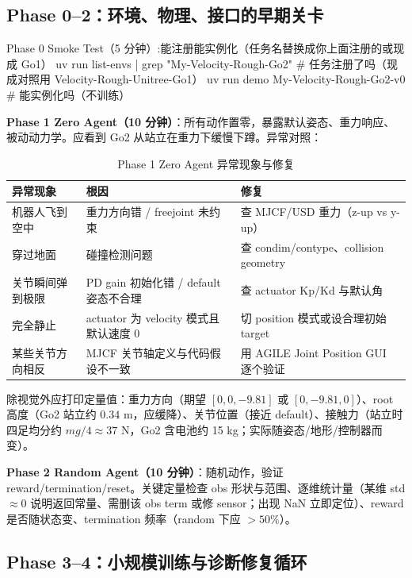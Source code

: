 \subsection{Phase 0--2：环境、物理、接口的早期关卡}

\begin{codebox}[bash]{Phase 0 Smoke Test（5 分钟）:能注册能实例化（任务名替换成你上面注册的或现成 Go1）}
uv run list-envs | grep "My-Velocity-Rough-Go2"   # 任务注册了吗（现成对照用 Velocity-Rough-Unitree-Go1）
uv run demo My-Velocity-Rough-Go2-v0              # 能实例化吗（不训练）
\end{codebox}

\textbf{Phase 1 Zero Agent（10 分钟）}：所有动作置零，暴露默认姿态、重力响应、被动动力学。应看到 Go2 从站立在重力下缓慢下蹲。异常对照：

\begin{table}[H]
\centering
\caption{Phase 1 Zero Agent 异常现象与修复}
\label{tab:rlmc-diag-zero}
\begin{tabular}{p{3.6cm}p{4.4cm}p{4.0cm}}
\hline
异常现象 & 根因 & 修复 \\
\hline
机器人飞到空中 & 重力方向错 / freejoint 未约束 & 查 MJCF/USD 重力（z-up vs y-up） \\
穿过地面 & 碰撞检测问题 & 查 condim/contype、collision geometry \\
关节瞬间弹到极限 & PD gain 初始化错 / default 姿态不合理 & 查 actuator Kp/Kd 与默认角 \\
完全静止 & actuator 为 velocity 模式且默认速度 0 & 切 position 模式或设合理初始 target \\
某些关节方向相反 & MJCF 关节轴定义与代码假设不一致 & 用 AGILE Joint Position GUI 逐个验证 \\
\hline
\end{tabular}
\end{table}

除视觉外应打印定量值：重力方向（期望 $[0,0,-9.81]$ 或 $[0,-9.81,0]$）、root 高度（Go2 站立约 $0.34$ m，应缓降）、关节位置（接近 default）、接触力（站立时四足均分约 $mg/4\approx 37$ N，Go2 含电池约 15 kg；实际随姿态/地形/控制器而变）。

\textbf{Phase 2 Random Agent（10 分钟）}：随机动作，验证 reward/termination/reset。关键定量检查 obs 形状与范围、逐维统计量（某维 std$\approx 0$ 说明返回常量、需删该 obs term 或修 sensor；出现 NaN 立即定位）、reward 是否随状态变、termination 频率（random 下应 $>50\%$）。

\subsection{Phase 3--4：小规模训练与诊断修复循环}

